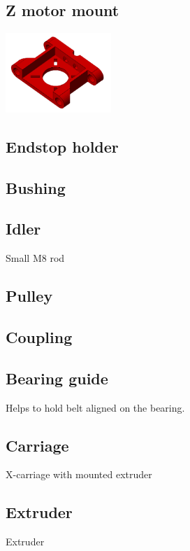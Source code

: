 \documentclass[11pt]{article}
\begin{document}
\hypertarget{thing_z-motor-mount}{\subsection{Z motor mount}}
\includegraphics[width=4cm]{images/z-motor-mount.png}

\hypertarget{thing_endstop-holder}{\subsection{Endstop holder}}

\hypertarget{thing_bushing}{\subsection{Bushing}}

\hypertarget{thing_idler-m8-piece}{\subsection{Idler}}
Small M8 rod

\hypertarget{thing_pulley}{\subsection{Pulley}}

\hypertarget{thing_coupling}{\subsection{Coupling}}

\hypertarget{thing_bearing-guide}{\subsection{Bearing guide}}
Helps to hold belt aligned on the bearing.

\hypertarget{thing_carriage}{\subsection{Carriage}}
X-carriage with mounted extruder

\hypertarget{thing_extruder}{\subsection{Extruder}}
Extruder
\end{document}

